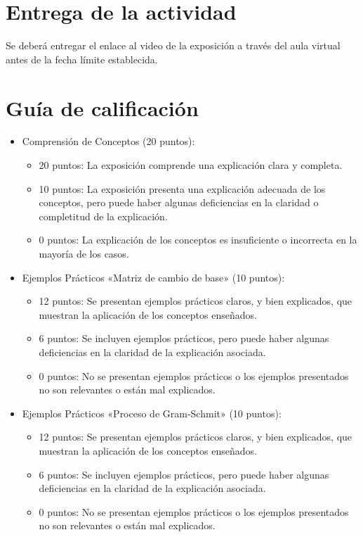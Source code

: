 \documentclass[a4,11pt]{aleph-notas}
\begin{document}
\section{Entrega de la actividad}

Se deberá entregar el enlace al video de la exposición a través del aula virtual antes de la fecha límite establecida.


\section{Guía de calificación}

\begin{itemize}
\item
    Comprensión de Conceptos (20 puntos):
    \begin{itemize}
        \item 20 puntos: La exposición comprende una explicación clara y completa.
        \item 10 puntos: La exposición presenta una explicación adecuada de los conceptos, pero puede haber algunas deficiencias en la claridad o completitud de la explicación.
        \item 0 puntos: La explicación de los conceptos es insuficiente o incorrecta en la mayoría de los casos.
    \end{itemize}

\item
    Ejemplos Prácticos «Matriz de cambio de base» (10 puntos):
    \begin{itemize}
        \item 12 puntos: Se presentan ejemplos prácticos claros, y bien explicados, que muestran la aplicación de los conceptos enseñados.
        \item 6 puntos: Se incluyen ejemplos prácticos, pero puede haber algunas deficiencias en la claridad de la explicación asociada.
        \item 0 puntos: No se presentan ejemplos prácticos o los ejemplos presentados no son relevantes o están mal explicados.
    \end{itemize}

\item
    Ejemplos Prácticos «Proceso de Gram-Schmit» (10 puntos):
    \begin{itemize}
        \item 12 puntos: Se presentan ejemplos prácticos claros, y bien explicados, que muestran la aplicación de los conceptos enseñados.
        \item 6 puntos: Se incluyen ejemplos prácticos, pero puede haber algunas deficiencias en la claridad de la explicación asociada.
        \item 0 puntos: No se presentan ejemplos prácticos o los ejemplos presentados no son relevantes o están mal explicados.
    \end{itemize}


\end{itemize}
\end{document}
